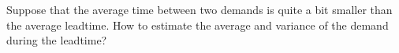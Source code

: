 \begin{exercise}
  Suppose that the average time between two demands is quite a bit smaller than the average leadtime. How to estimate the average and variance of the demand during the leadtime?
\end{exercise}

